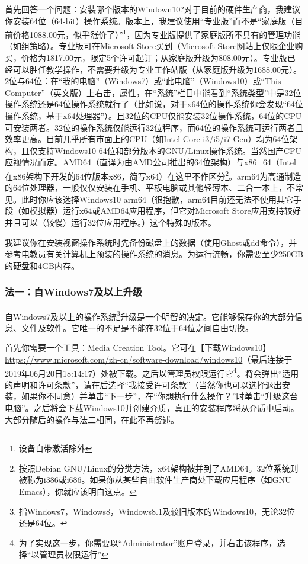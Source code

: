 首先回答一个问题：安装哪个版本的Windown10?对于目前的硬件生产商，我建议你安装64位（64-bit）操作系统。版本上，我建议使用“专业版”而不是“家庭版（目前价格1088.00元，似乎涨价了）”\footnote{设备自带激活除外}，因为专业版提供了家庭版所不具有的管理功能（如组策略）。专业版可在Microsoft Store买到（Microsoft Store网站上仅限企业购买，价格为1817.00元，限定5个许可起订；从家庭版升级为808.00元）。专业版已经可以胜任教学操作，不需要升级为专业工作站版（从家庭版升级为1688.00元）。 2位与64位：在“我的电脑”（Windows7）或“此电脑”（Windows10）或“This Computer”（英文版）上右击，属性，在“系统”栏目中能看到“系统类型”中是32位操作系统还是64位操作系统就行了（比如说，对于x64位的操作系统你会发现“64位操作系统，基于x64处理器”）。且32位的CPU仅能安装32位操作系统，64位的CPU可安装两者。32位的操作系统仅能运行32位程序，而64位的操作系统可运行两者且效率更高。目前几乎所有市面上的CPU（如Intel Core i3/i5/i7  Gen）均为64位架构，且仅支持Windows10 64位和部分版本的GNU/Linux操作系统。当然国产CPU应视情况而定。AMD64（直译为由AMD公司推出的64位架构）与x86\_64（Intel在x86架构下开发的64位版本x86，简写x64）在这里不作区分\footnote{按照Debian GNU/Linux的分类方法，x64架构被并到了AMD64。32位系统则被称为i386或i686。如果你从某些自由软件生产商处下载应用程序（如GNU Emacs），你就应该明白这点。}。arm64为高通制造的64位处理器，一般仅仅安装在手机、平板电脑或其他轻薄本、二合一本上，不常见。此时你应该选择Windows10 arm64（很抱歉，arm64目前还无法不使用其它手段（如模拟器）运行x64或AMD64应用程序，但它对Microsoft Store应用支持较好并且可以（较慢）运行32位应用程序。）这个特殊的版本。\par
\begin{center} \bf \large {\color{red}{警告！即使使用微软提供的映像，第三方安装工具也可能会向计算机注入病毒或安装用户不需要的软件！因此请尽量不要使用非官方的工具来安装系统！}}\end{center}\par
我建议你在安装视窗操作系统时先备份磁盘上的数据（使用Ghost或dd命令），并参考电教员有关计算机上预装的操作系统的消息。为运行流畅，你需要至少250GB的硬盘和4GB内存。
\subsubsection{法一：自Windows7及以上升级}
自Windows7及以上的操作系统\footnote{指Windows7，Windows8，Windows8.1及较旧版本的Windows10，无论32位还是64位。}升级是一个明智的决定。它能够保存你的大部分信息、文件及软件。它唯一的不足是不能在32位于64位之间自由切换。\par
首先你需要一个工具：Media Creation Tool。它可在【下载Windows10】\url{https://www.microsoft.com/zh-cn/software-download/windows10}（最后连接于2019年06月20日18:14:17）处被下载。之后以管理员权限运行它\footnote{为了实现这一步，你需要以“Administrator”账户登录，并右击该程序，选择“以管理员权限运行”}。将会弹出“适用的声明和许可条款”，请在{\color{red}{仔细阅读}}后选择“我接受许可条款”（当然你也可以选择退出安装，如果你不同意）并单击“下一步”，在“你想执行什么操作？”时单击“升级这台电脑”。之后将会下载Windows10并创建介质，真正的安装程序将从介质中启动。大部分随后的操作与法二相同，在此不再赘述。
